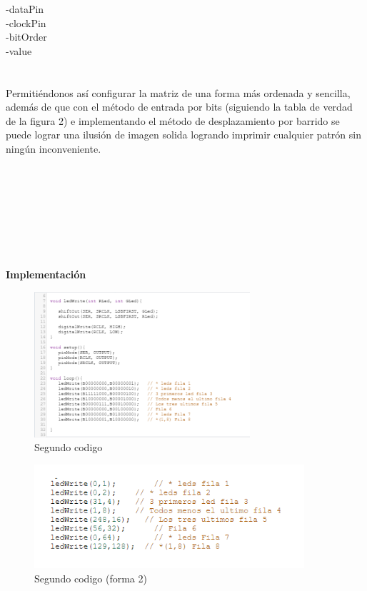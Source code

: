 \documentclass{article}
\begin{document}
-dataPin\\

-clockPin\\

-bitOrder\\

-value\\
\\\\

Permitiéndonos así configurar la matriz de una forma más ordenada y sencilla, además de que con el método de entrada por bits (siguiendo la tabla de verdad  de la figura 2) e implementando el método de desplazamiento por barrido \cite{veritasium} se puede lograr una ilusión de imagen solida logrando imprimir cualquier patrón sin ningún inconveniente.\\\\
\\\\
\\\\
\\\\
\\

\textbf{\large Implementación}\\
\begin{figure}[h]
    \includegraphics[width=8cm]{Imagen4.png}
    \centering
    \caption{Segundo codigo}
    \label{fig:Imagen4}
\end{figure}
\begin{figure}[h]
    \includegraphics[width=10cm]{Imagen5.png}
    \centering
    \caption{Segundo codigo (forma 2)}
    \label{fig:Imagen4}
\end{figure}\\\\
\\\\
\end{document}
